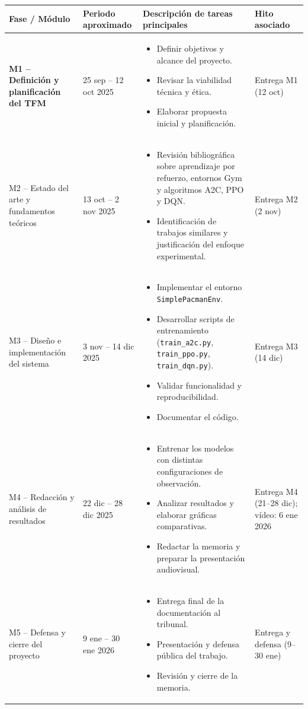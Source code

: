 \begin{longtable}{|>{\bfseries}p{3cm}|p{2.8cm}|p{7.8cm}|p{2.8cm}|}
\hline
Fase / Módulo & Periodo aproximado & Descripción de tareas principales & Hito asociado \\
\hline
M1 -- Definición y planificación del TFM & 25 sep -- 12 oct 2025 & 
\begin{itemize}
\item Definir objetivos y alcance del proyecto.
\item Revisar la viabilidad técnica y ética.
\item Elaborar propuesta inicial y planificación.
\end{itemize} & Entrega M1 (12 oct) \\ \hline

M2 -- Estado del arte y fundamentos teóricos & 13 oct -- 2 nov 2025 &
\begin{itemize}
\item Revisión bibliográfica sobre aprendizaje por refuerzo, entornos Gym y algoritmos A2C, PPO y DQN.
\item Identificación de trabajos similares y justificación del enfoque experimental.
\end{itemize} & Entrega M2 (2 nov) \\ \hline

M3 -- Diseño e implementación del sistema & 3 nov -- 14 dic 2025 &
\begin{itemize}
\item Implementar el entorno \texttt{SimplePacmanEnv}.
\item Desarrollar scripts de entrenamiento (\texttt{train\_a2c.py}, \texttt{train\_ppo.py}, \texttt{train\_dqn.py}).
\item Validar funcionalidad y reproducibilidad.
\item Documentar el código.
\end{itemize} & Entrega M3 (14 dic) \\ \hline

M4 -- Redacción y análisis de resultados & 22 dic -- 28 dic 2025 &
\begin{itemize}
\item Entrenar los modelos con distintas configuraciones de observación.
\item Analizar resultados y elaborar gráficas comparativas.
\item Redactar la memoria y preparar la presentación audiovisual.
\end{itemize} & Entrega M4 (21--28 dic); vídeo: 6 ene 2026 \\ \hline

M5 -- Defensa y cierre del proyecto & 9 ene -- 30 ene 2026 &
\begin{itemize}
\item Entrega final de la documentación al tribunal.
\item Presentación y defensa pública del trabajo.
\item Revisión y cierre de la memoria.
\end{itemize} & Entrega y defensa (9--30 ene) \\ \hline
\end{longtable}

